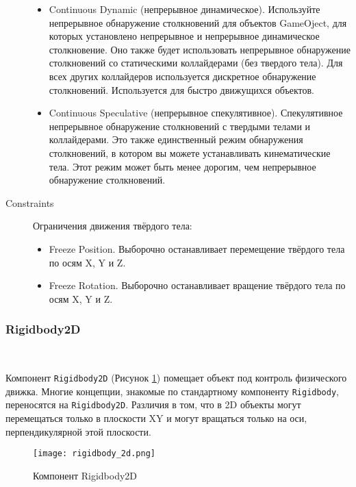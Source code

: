 \begin{description}
\begin{itemize}
		\item Continuous Dynamic (непрерывное динамическое). Используйте непрерывное обнаружение столкновений для объектов GameOject, для которых установлено непрерывное и непрерывное динамическое столкновение. Оно также будет использовать непрерывное обнаружение столкновений со статическими коллайдерами (без твердого тела). Для всех других коллайдеров используется дискретное обнаружение столкновений. Используется для быстро движущихся объектов.
		\item Continuous Speculative (непрерывное спекулятивное). Спекулятивное непрерывное обнаружение столкновений с твердыми телами и коллайдерами. Это также единственный режим обнаружения столкновений, в котором вы можете устанавливать кинематические тела. Этот режим может быть менее дорогим, чем непрерывное обнаружение столкновений.
	\end{itemize}
	\item[Constraints] Ограничения движения твёрдого тела:
	\begin{itemize}
		\item Freeze Position. Выборочно останавливает перемещение твёрдого тела по осям X, Y и Z.
		\item Freeze Rotation. Выборочно останавливает вращение твёрдого тела по осям X, Y и Z.
	\end{itemize}
\end{description}

\subsubsection{Rigidbody2D}~

Компонент \lstinline|Rigidbody2D| (Рисунок \ref{fig:domain:sec_project:rigidbody_2d}) помещает объект под контроль физического движка. Многие концепции, знакомые по стандартному компоненту \lstinline|Rigidbody|, переносятся на \lstinline|Rigidbody2D|. Различия в том, что в 2D объекты могут перемещаться только в плоскости XY и могут вращаться только на оси, перпендикулярной этой плоскости.

\begin{figure}[h]
	\noindent\centering
	\texttt{[image: rigidbody\_2d.png]}  
	\caption{Компонент Rigidbody2D}
	\label{fig:domain:sec_project:rigidbody_2d}
\end{figure}

